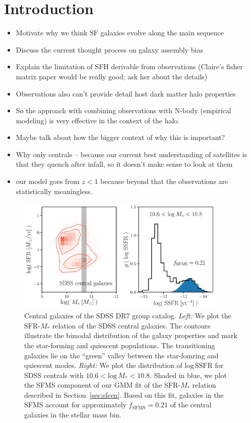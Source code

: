 \documentclass[12pt, letterpaper, preprint]{aastex}
\newcommand{\bitem}{\begin{itemize}}
\newcommand{\eitem}{\end{itemize}}
\begin{document}
\section{Introduction}
\bitem 
\item Motivate why we think SF galaxies evolve along the main sequence  
\item Discuss the current thought process on galaxy assembly bias 
\item Explain the limitation of SFH derivable from observations (Claire's fisher matrix paper would be really good; ask her about the details) 
\item Observations also can't provide detail host dark matter halo properties
\item So the approach with combining observations with N-body (empirical modeling) is very effective in the context of the halo.
\item Maybe talk about how the bigger context of why this is important?  
\item Why only centrals -- because our current best understanding of satellites is that they quench after infall, so it doesn't make sense to look at them
\item our model goes from $z < 1$ because beyond that the observations are statistically meaningless.  
\eitem 

\begin{figure}
\begin{center}
\includegraphics[width=0.9\textwidth]{figs/groupcat.pdf}
    \caption{Central galaxies of the SDSS DR7 group catalog. \emph{Left:} We plot 
    the SFR-$M_*$ relation of the SDSS central galaxies. The contours illustrate the bimodal
    distribution of the galaxy properties and mark the star-forming and quiescent populations. 
    The transitioning galaxies lie on the ``green'' valley between the star-fomring and quiescent
    modes. %
    \emph{Right:} We plot the distribution of $\mathrm{log}\,\mathrm{SSFR}$ for SDSS centrals
    with $10.6 < \mathrm{log}\,M_* < 10.8$. Shaded in blue, we plot the SFMS component of our 
    GMM fit of the SFR-$M_*$ relation described in Section~\ref{sec:sfcen}. Based on this fit, 
    galaxies in the SFMS account for approximately $f_\mathrm{SFMS} = 0.21$ of the central 
    galaxies in the stellar mass bin.} \label{fig:groupcat}
\end{center}
\end{figure}
\end{document}
